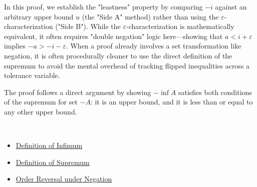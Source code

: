 \begin{remark*}
In this proof, we establish the "leastness" property by comparing $-i$ against an arbitrary upper bound $u$ (the "Side A" method) rather than using the $\varepsilon$-characterization ("Side B"). While the $\varepsilon$-characterization is mathematically equivalent, it often requires "double negation" logic here—showing that $a < i + \varepsilon$ implies $-a > -i - \varepsilon$. When a proof already involves a set transformation like negation, it is often procedurally cleaner to use the direct definition of the supremum to avoid the mental overhead of tracking flipped inequalities across a tolerance variable.
\end{remark*}

\begin{remark*}
The proof follows a direct argument by showing $- \inf A$ satisfies both conditions of the supremum for set $-A$: it is an upper bound, and it is less than or equal to any other upper bound.
\end{remark*}

\begin{remark*}[Dependencies]~\\
\begin{itemize}
  \item \hyperref[pred:infimum]{Definition of Infimum}
  \item \hyperref[pred:supremum]{Definition of Supremum}
  \item \hyperref[ax:inequality-negation]{Order Reversal under Negation}
\end{itemize}
\end{remark*}